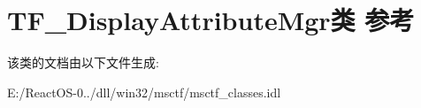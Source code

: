 \hypertarget{class_t_f___display_attribute_mgr}{}\section{T\+F\+\_\+\+Display\+Attribute\+Mgr类 参考}
\label{class_t_f___display_attribute_mgr}


该类的文档由以下文件生成\+:\begin{DoxyCompactItemize}
\item 
E\+:/\+React\+O\+S-\/0../dll/win32/msctf/msctf\+\_\+classes.\+idl\end{DoxyCompactItemize}

